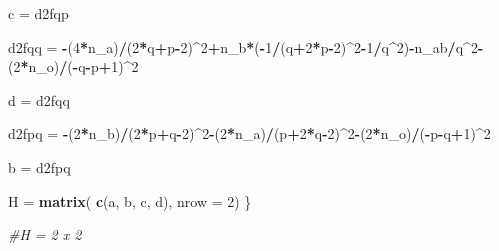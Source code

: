 \documentclass[]{article}
\newenvironment{Shaded}{\begin{snugshade}}{\end{snugshade}}
\newcommand{\KeywordTok}[1]{\textcolor[rgb]{0.13,0.29,0.53}{\textbf{#1}}}
\newcommand{\DataTypeTok}[1]{\textcolor[rgb]{0.13,0.29,0.53}{#1}}
\newcommand{\DecValTok}[1]{\textcolor[rgb]{0.00,0.00,0.81}{#1}}
\newcommand{\StringTok}[1]{\textcolor[rgb]{0.31,0.60,0.02}{#1}}
\newcommand{\CommentTok}[1]{\textcolor[rgb]{0.56,0.35,0.01}{\textit{#1}}}
\newcommand{\OperatorTok}[1]{\textcolor[rgb]{0.81,0.36,0.00}{\textbf{#1}}}
\newcommand{\NormalTok}[1]{#1}
\begin{document}
\begin{Shaded}
\begin{Highlighting}[]
    
    
\NormalTok{     c =}\StringTok{ }\NormalTok{d2fqp    }
    
    
    
\NormalTok{    d2fqq =}\StringTok{ }\OperatorTok{-}\NormalTok{(}\DecValTok{4}\OperatorTok{*}\NormalTok{n_a)}\OperatorTok{/}\NormalTok{(}\DecValTok{2}\OperatorTok{*}\NormalTok{q}\OperatorTok{+}\NormalTok{p}\OperatorTok{-}\DecValTok{2}\NormalTok{)}\OperatorTok{^}\DecValTok{2}\OperatorTok{+}\NormalTok{n_b}\OperatorTok{*}\NormalTok{(}\OperatorTok{-}\DecValTok{1}\OperatorTok{/}\NormalTok{(q}\OperatorTok{+}\DecValTok{2}\OperatorTok{*}\NormalTok{p}\OperatorTok{-}\DecValTok{2}\NormalTok{)}\OperatorTok{^}\DecValTok{2}\OperatorTok{-}\DecValTok{1}\OperatorTok{/}\NormalTok{q}\OperatorTok{^}\DecValTok{2}\NormalTok{)}\OperatorTok{-}\NormalTok{n_ab}\OperatorTok{/}\NormalTok{q}\OperatorTok{^}\DecValTok{2}\OperatorTok{-}\NormalTok{(}\DecValTok{2}\OperatorTok{*}\NormalTok{n_o)}\OperatorTok{/}\NormalTok{(}\OperatorTok{-}\NormalTok{q}\OperatorTok{-}\NormalTok{p}\OperatorTok{+}\DecValTok{1}\NormalTok{)}\OperatorTok{^}\DecValTok{2}
    
    
    
    
\NormalTok{     d =}\StringTok{ }\NormalTok{d2fqq}
    
    
    
    
    
\NormalTok{    d2fpq =}\StringTok{ }\OperatorTok{-}\NormalTok{(}\DecValTok{2}\OperatorTok{*}\NormalTok{n_b)}\OperatorTok{/}\NormalTok{(}\DecValTok{2}\OperatorTok{*}\NormalTok{p}\OperatorTok{+}\NormalTok{q}\OperatorTok{-}\DecValTok{2}\NormalTok{)}\OperatorTok{^}\DecValTok{2}\OperatorTok{-}\NormalTok{(}\DecValTok{2}\OperatorTok{*}\NormalTok{n_a)}\OperatorTok{/}\NormalTok{(p}\OperatorTok{+}\DecValTok{2}\OperatorTok{*}\NormalTok{q}\OperatorTok{-}\DecValTok{2}\NormalTok{)}\OperatorTok{^}\DecValTok{2}\OperatorTok{-}\NormalTok{(}\DecValTok{2}\OperatorTok{*}\NormalTok{n_o)}\OperatorTok{/}\NormalTok{(}\OperatorTok{-}\NormalTok{p}\OperatorTok{-}\NormalTok{q}\OperatorTok{+}\DecValTok{1}\NormalTok{)}\OperatorTok{^}\DecValTok{2}
    
    
    
    
\NormalTok{     b =}\StringTok{ }\NormalTok{d2fpq}
    
    
    
    
    

    
    
    
      
\NormalTok{    H =}\StringTok{ }\KeywordTok{matrix}\NormalTok{( }\KeywordTok{c}\NormalTok{(a, b, c, d), }\DataTypeTok{nrow =} \DecValTok{2}\NormalTok{)}
\NormalTok{\}}

\CommentTok{#H = 2 x 2}
\end{Highlighting}
\end{Shaded}
\end{document}
